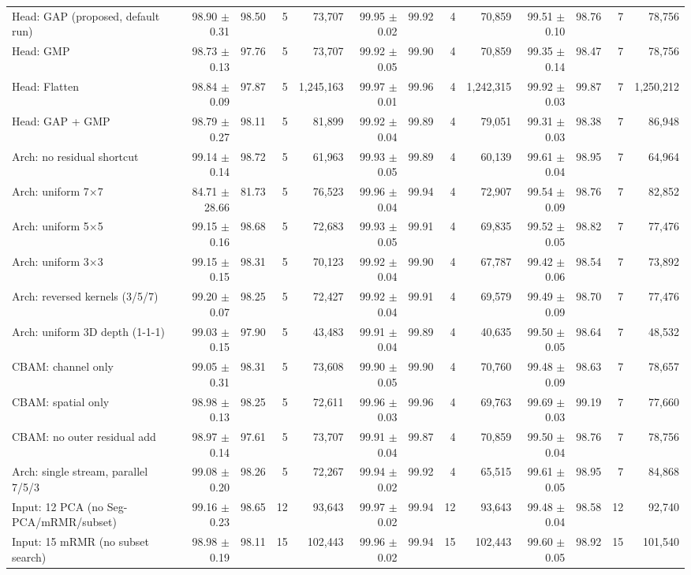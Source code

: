 \documentclass[10pt]{article}
\begin{document}
\begin{center}
{\begin{tabular}{@{}lrrrrrrrrrrrr@{}}
\midrule
Head: GAP (proposed, default run) & 98.90 $\pm$ 0.31 & 98.50 & 5 & 73{,}707 & 99.95 $\pm$ 0.02 & 99.92 & 4 & 70{,}859 & 99.51 $\pm$ 0.10 & 98.76 & 7 & 78{,}756 \\
Head: GMP & 98.73 $\pm$ 0.13 & 97.76 & 5 & 73{,}707 & 99.92 $\pm$ 0.05 & 99.90 & 4 & 70{,}859 & 99.35 $\pm$ 0.14 & 98.47 & 7 & 78{,}756 \\
Head: Flatten & 98.84 $\pm$ 0.09 & 97.87 & 5 & 1{,}245{,}163 & 99.97 $\pm$ 0.01 & 99.96 & 4 & 1{,}242{,}315 & 99.92 $\pm$ 0.03 & 99.87 & 7 & 1{,}250{,}212 \\
Head: GAP + GMP & 98.79 $\pm$ 0.27 & 98.11 & 5 & 81{,}899 & 99.92 $\pm$ 0.04 & 99.89 & 4 & 79{,}051 & 99.31 $\pm$ 0.03 & 98.38 & 7 & 86{,}948 \\
\midrule
Arch: no residual shortcut & 99.14 $\pm$ 0.14 & 98.72 & 5 & 61{,}963 & 99.93 $\pm$ 0.05 & 99.89 & 4 & 60{,}139 & 99.61 $\pm$ 0.04 & 98.95 & 7 & 64{,}964 \\
Arch: uniform 7$\times$7 & 84.71 $\pm$ 28.66 & 81.73 & 5 & 76{,}523 & 99.96 $\pm$ 0.04 & 99.94 & 4 & 72{,}907 & 99.54 $\pm$ 0.09 & 98.76 & 7 & 82{,}852 \\
Arch: uniform 5$\times$5 & 99.15 $\pm$ 0.16 & 98.68 & 5 & 72{,}683 & 99.93 $\pm$ 0.05 & 99.91 & 4 & 69{,}835 & 99.52 $\pm$ 0.05 & 98.82 & 7 & 77{,}476 \\
Arch: uniform 3$\times$3 & 99.15 $\pm$ 0.15 & 98.31 & 5 & 70{,}123 & 99.92 $\pm$ 0.04 & 99.90 & 4 & 67{,}787 & 99.42 $\pm$ 0.06 & 98.54 & 7 & 73{,}892 \\
Arch: reversed kernels (3/5/7) & 99.20 $\pm$ 0.07 & 98.25 & 5 & 72{,}427 & 99.92 $\pm$ 0.04 & 99.91 & 4 & 69{,}579 & 99.49 $\pm$ 0.09 & 98.70 & 7 & 77{,}476 \\
Arch: uniform 3D depth (1-1-1) & 99.03 $\pm$ 0.15 & 97.90 & 5 & 43{,}483 & 99.91 $\pm$ 0.04 & 99.89 & 4 & 40{,}635 & 99.50 $\pm$ 0.05 & 98.64 & 7 & 48{,}532 \\
\midrule
CBAM: channel only & 99.05 $\pm$ 0.31 & 98.31 & 5 & 73{,}608 & 99.90 $\pm$ 0.05 & 99.90 & 4 & 70{,}760 & 99.48 $\pm$ 0.09 & 98.63 & 7 & 78{,}657 \\
CBAM: spatial only & 98.98 $\pm$ 0.13 & 98.25 & 5 & 72{,}611 & 99.96 $\pm$ 0.03 & 99.96 & 4 & 69{,}763 & 99.69 $\pm$ 0.03 & 99.19 & 7 & 77{,}660 \\
CBAM: no outer residual add & 98.97 $\pm$ 0.14 & 97.61 & 5 & 73{,}707 & 99.91 $\pm$ 0.04 & 99.87 & 4 & 70{,}859 & 99.50 $\pm$ 0.04 & 98.76 & 7 & 78{,}756 \\
\midrule
Arch: single stream, parallel 7/5/3 & 99.08 $\pm$ 0.20 & 98.26 & 5 & 72{,}267 & 99.94 $\pm$ 0.02 & 99.92 & 4 & 65{,}515 & 99.61 $\pm$ 0.05 & 98.95 & 7 & 84{,}868 \\
\midrule
Input: 12 PCA (no Seg-PCA/mRMR/subset) & 99.16 $\pm$ 0.23 & 98.65 & 12 & 93{,}643 & 99.97 $\pm$ 0.02 & 99.94 & 12 & 93{,}643 & 99.48 $\pm$ 0.04 & 98.58 & 12 & 92{,}740 \\
Input: 15 mRMR (no subset search) & 98.98 $\pm$ 0.19 & 98.11 & 15 & 102{,}443 & 99.96 $\pm$ 0.02 & 99.94 & 15 & 102{,}443 & 99.60 $\pm$ 0.05 & 98.92 & 15 & 101{,}540 \\
\bottomrule
\end{tabular}}
\end{center}
\end{document}
